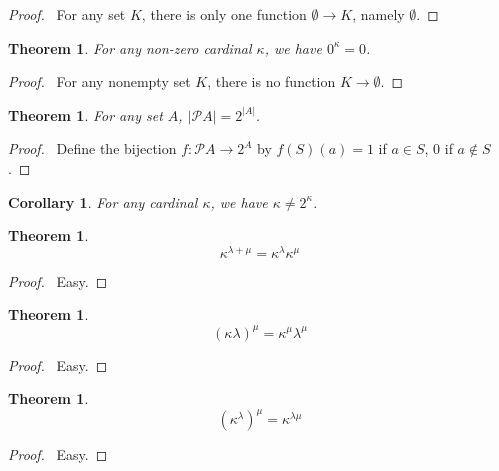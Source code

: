 \documentclass{article}
\let\qed\relax
\newtheorem{theorem}[axiom]{Theorem}
\newtheorem{corollary}{Corollary}[axiom]
\theoremstyle{definition}
\begin{document}
    \begin{proof}
        \pf\ For any set $K$, there is only one function $\emptyset \rightarrow K$, namely $\emptyset$. \qed
    \end{proof}

    \begin{theorem}
        For any non-zero cardinal $\kappa$, we have $0^\kappa = 0$.
    \end{theorem}

    \begin{proof}
        \pf\ For any nonempty set $K$, there is no function $K \rightarrow \emptyset$. \qed
    \end{proof}

    \begin{theorem}
        For any set $A$, $|\mathcal{P} A| = 2^{|A|}$.
    \end{theorem}

    \begin{proof}
        \pf\ Define the bijection $f : \mathcal{P} A \rightarrow 2^A$ by $f(S)(a) = 1$ if $a \in S$,
        0 if $a \notin S$. \qed
    \end{proof}

    \begin{corollary}
        For any cardinal $\kappa$, we have $\kappa \neq 2^\kappa$.
    \end{corollary}

    \begin{theorem}
        \[ \kappa^{\lambda + \mu} = \kappa^\lambda \kappa^\mu \]
    \end{theorem}

    \begin{proof}
        \pf\ Easy. \qed
    \end{proof}

    \begin{theorem}
        \[ (\kappa \lambda)^\mu = \kappa^\mu \lambda^\mu \]
    \end{theorem}

    \begin{proof}
        \pf\ Easy. \qed
    \end{proof}

    \begin{theorem}
        \[ (\kappa^\lambda)^\mu = \kappa^{\lambda \mu} \]
    \end{theorem}

    \begin{proof}
        \pf\ Easy. \qed
    \end{proof}
\end{document}

